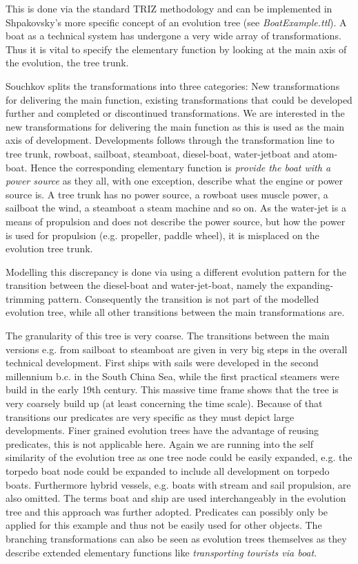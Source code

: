 \documentclass[11pt,a4paper]{article}
\begin{document}
This is done via the standard TRIZ methodology and can be implemented in
Shpakovsky's more specific concept of an evolution tree (see
\textit{BoatExample.ttl}). A boat as a technical system has undergone a very
wide array of transformations. Thus it is vital to specify the elementary
function by looking at the main axis of the evolution, the tree trunk.

Souchkov splits the transformations into three categories: New transformations
for delivering the main function, existing transformations that could be
developed further and completed or discontinued transformations. We are
interested in the new transformations for delivering the main function as this
is used as the main axis of development. Developments follows through the
transformation line to tree trunk, rowboat, sailboat, steamboat, diesel-boat,
water-jetboat and atom-boat. Hence the corresponding elementary function is
\textit{provide the boat with a power source} as they all, with one exception,
describe what the engine or power source is. A tree trunk has no power source,
a rowboat uses muscle power, a sailboat the wind, a steamboat a steam machine
and so on. As the water-jet is a means of propulsion and does not describe the
power source, but how the power is used for propulsion (e.g. propeller, paddle
wheel), it is misplaced on the evolution tree trunk.

Modelling this discrepancy is done via using a different evolution pattern for
the transition between the diesel-boat and water-jet-boat, namely the
expanding-trimming pattern. Consequently the transition is not part of the
modelled evolution tree, while all other transitions between the main
transformations are. 

The granularity of this tree is very coarse. The transitions between the main
versions e.g. from sailboat to steamboat are given in very big steps in the
overall technical development. First ships with sails were developed in the
second millennium b.c. in the South China Sea, while the first practical
steamers were build in the early 19th century. This massive time frame shows
that the tree is very coarsely build up (at least concerning the time scale).
Because of that transitions our predicates are very specific as they must
depict large developments. Finer grained evolution trees have the advantage of
reusing predicates, this is not applicable here. Again we are running into the
self similarity of the evolution tree as one tree node could be easily
expanded, e.g. the torpedo boat node could be expanded to include all
development on torpedo boats. Furthermore hybrid vessels, e.g. boats with
stream and sail propulsion, are also omitted. The terms boat and ship are used
interchangeably in the evolution tree and this approach was further adopted.
Predicates can possibly only be applied for this example and thus not be
easily used for other objects. The branching transformations can also be seen
as evolution trees themselves as they describe extended elementary functions
like \textit{transporting tourists via boat}.
\end{document}
